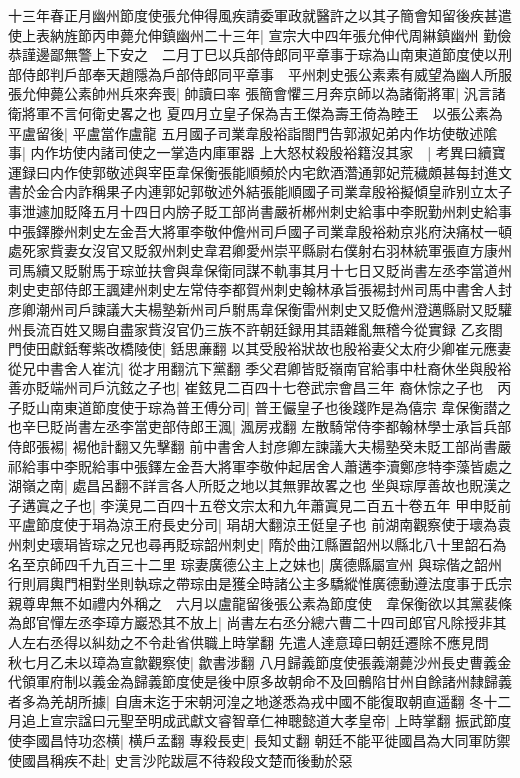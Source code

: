 十三年春正月幽州節度使張允伸得風疾請委軍政就醫許之以其子簡會知留後疾甚遣使上表納旌節丙申薨允伸鎮幽州二十三年|{
	宣宗大中四年張允伸代周綝鎮幽州}
勤儉恭謹邊鄙無警上下安之　二月丁巳以兵部侍郎同平章事于琮為山南東道節度使以刑部侍郎判戶部奉天趙隱為戶部侍郎同平章事　平州刺史張公素素有威望為幽人所服張允伸薨公素帥州兵來奔喪|{
	帥讀曰率}
張簡會懼三月奔京師以為諸衛將軍|{
	汎言諸衛將軍不言何衛史畧之也}
夏四月立皇子保為吉王傑為壽王倚為睦王　以張公素為平盧留後|{
	平盧當作盧龍}
五月國子司業韋殷裕詣閤門告郭淑妃弟内作坊使敬述隂事|{
	内作坊使内諸司使之一掌造内庫軍器}
上大怒杖殺殷裕籍沒其家　|{
	考異曰續寶運録曰内作使郭敬述與宰臣韋保衡張能順頻於内宅飲酒濳通郭妃荒穢頗甚每封進文書於金合内詐稱果子内連郭妃郭敬述外結張能順國子司業韋殷裕擬傾皇祚别立太子事泄遽加貶降五月十四日内牓子貶工部尚書嚴祈郴州刺史給事中李貺勤州刺史給事中張鐸滕州刺史左金吾大將軍李敬仲儋州司戶國子司業韋殷裕勑京兆府決痛杖一頓處死家貲妻女沒官又貶叙州刺史韋君卿愛州崇平縣尉右僕射右羽林統軍張直方康州司馬續又貶駙馬于琮並扶會與韋保衛同謀不軌事其月十七日又貶尚書左丞李當道州刺史吏部侍郎王諷建州刺史左常侍李都賀州刺史翰林承旨張裼封州司馬中書舍人封彦卿潮州司戶諫議大夫楊塾新州司戶駙馬韋保衡雷州刺史又貶儋州澄邁縣尉又貶驩州長流百姓又賜自盡家貲沒官仍三族不許朝廷録用其語雜亂無稽今從實録}
乙亥閤門使田獻銛奪紫改橋陵使|{
	銛思亷翻}
以其受殷裕狀故也殷裕妻父太府少卿崔元應妻從兄中書舍人崔沆|{
	從才用翻沆下黨翻}
季父君卿皆貶嶺南官給事中杜裔休坐與殷裕善亦貶端州司戶沆鉉之子也|{
	崔鉉見二百四十七卷武宗會昌三年}
裔休悰之子也　丙子貶山南東道節度使于琮為普王傅分司|{
	普王儼皇子也後踐阼是為僖宗}
韋保衡譛之也辛巳貶尚書左丞李當吏部侍郎王渢|{
	渢房戎翻}
左散騎常侍李都翰林學士承旨兵部侍郎張裼|{
	裼他計翻又先擊翻}
前中書舍人封彦卿左諫議大夫楊塾癸未貶工部尚書嚴祁給事中李貺給事中張鐸左金吾大將軍李敬仲起居舍人蕭遘李瀆鄭彦特李藻皆處之湖嶺之南|{
	處昌呂翻不詳言各人所貶之地以其無罪故畧之也}
坐與琮厚善故也貺漢之子遘寘之子也|{
	李漢見二百四十五卷文宗太和九年蕭寘見二百五十卷五年}
甲申貶前平盧節度使于琄為涼王府長史分司|{
	琄胡大翻涼王侹皇子也}
前湖南觀察使于瓌為袁州刺史瓌琄皆琮之兄也尋再貶琮韶州刺史|{
	隋於曲江縣置韶州以縣北八十里韶石為名至京師四千九百三十二里}
琮妻廣德公主上之妹也|{
	廣德縣屬宣州}
與琮偕之韶州行則肩輿門相對坐則執琮之帶琮由是獲全時諸公主多驕縱惟廣德動遵法度事于氏宗親尊卑無不如禮内外稱之　六月以盧龍留後張公素為節度使　韋保衡欲以其黨裴條為郎官憚左丞李璋方巖恐其不放上|{
	尚書左右丞分總六曹二十四司郎官凡除授非其人左右丞得以糾劾之不令赴省供職上時掌翻}
先遣人達意璋曰朝廷遷除不應見問　秋七月乙未以璋為宣歙觀察使|{
	歙書涉翻}
八月歸義節度使張義潮薨沙州長史曹義金代領軍府制以義金為歸義節度使是後中原多故朝命不及回鶻陷甘州自餘諸州隸歸義者多為羌胡所據|{
	自唐末迄于宋朝河湟之地遂悉為戎中國不能復取朝直遥翻}
冬十二月追上宣宗諡曰元聖至明成武獻文睿智章仁神聰懿道大孝皇帝|{
	上時掌翻}
振武節度使李國昌恃功恣横|{
	横戶孟翻}
專殺長吏|{
	長知丈翻}
朝廷不能平徙國昌為大同軍防禦使國昌稱疾不赴|{
	史言沙陀跋扈不待殺段文楚而後動於惡}


